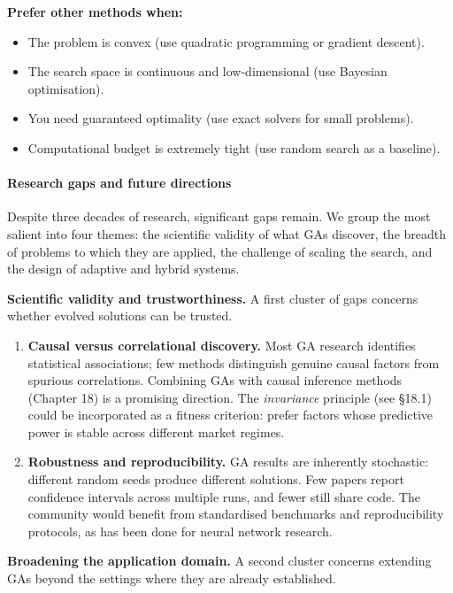 \textbf{Prefer other methods when:}

\begin{itemize}
\item The problem is convex (use quadratic programming or gradient descent).
\item The search space is continuous and low-dimensional (use Bayesian optimisation).
\item You need guaranteed optimality (use exact solvers for small problems).
\item Computational budget is extremely tight (use random search as a baseline).
\end{itemize}

\paragraph{Research gaps and future directions}

Despite three decades of research, significant gaps remain. We group the most salient into four themes: the scientific validity of what GAs discover, the breadth of problems to which they are applied, the challenge of scaling the search, and the design of adaptive and hybrid systems.

\textbf{Scientific validity and trustworthiness.} A first cluster of gaps concerns whether evolved solutions can be trusted.

\begin{enumerate}
\item \textbf{Causal versus correlational discovery.} Most GA research identifies statistical associations; few methods distinguish genuine causal factors from spurious correlations. Combining GAs with causal inference methods (Chapter 18) is a promising direction. The \textit{invariance} principle (see §18.1) could be incorporated as a fitness criterion: prefer factors whose predictive power is stable across different market regimes.
\item \textbf{Robustness and reproducibility.} GA results are inherently stochastic: different random seeds produce different solutions. Few papers report confidence intervals across multiple runs, and fewer still share code. The community would benefit from standardised benchmarks and reproducibility protocols, as has been done for neural network research.
\end{enumerate}

\textbf{Broadening the application domain.} A second cluster concerns extending GAs beyond the settings where they are already established.

